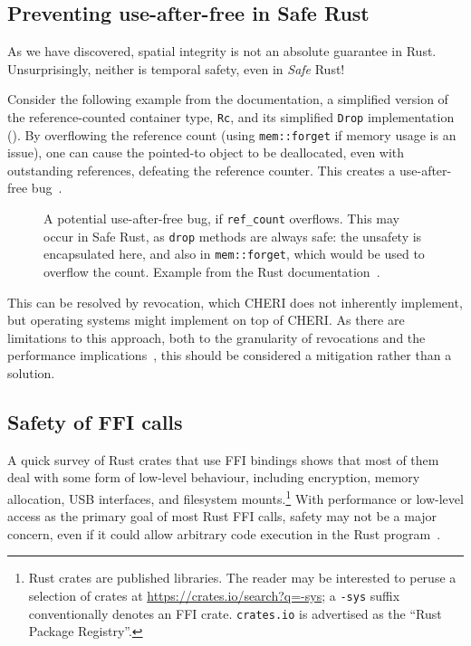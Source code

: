 \documentclass[dissertation.tex]{subfiles}
\begin{document}
\subsection{Preventing use-after-free in Safe Rust}
\label{sec:eval-rust-use-after-free}

As we have discovered, spatial integrity is not an absolute guarantee in
Rust.
Unsurprisingly, neither is temporal safety, even in \emph{Safe} Rust!

Consider the following example from the documentation, a simplified
version of the reference-counted container type, \texttt{Rc}, and its
simplified \texttt{Drop} implementation ().
By overflowing the reference count (using \texttt{mem::forget} if memory
usage is an issue), one can cause the pointed-to object to be
deallocated, even with outstanding references, defeating the reference
counter.
This creates a use-after-free bug~\cite{rust-nomicon-rc-leak}.

\begin{figure}[ht]
    
    \caption{
        A potential use-after-free bug, if \texttt{ref\_count}
        overflows.
        This may occur in Safe Rust, as \texttt{drop} methods are always
        safe: the unsafety is encapsulated here, and also in
        \texttt{mem::forget}, which would be used to overflow the count.
        Example from the Rust documentation~\cite{rust-nomicon-rc-leak}.
    }
    \label{lst:eval-rust-rc-drop}
\end{figure}

This can be resolved by revocation, which CHERI does not inherently
implement, but operating systems might implement on top of CHERI.
As there are limitations to this approach, both to the granularity of
revocations and the performance implications~\cite{cheri-v6}, this
should be considered a mitigation rather than a solution.


\subsection{Safety of FFI calls}
\label{sec:eval-rust-xprocess}


A quick survey of Rust crates that use FFI bindings shows that most of
them deal with some form of low-level behaviour, including encryption,
memory allocation, USB interfaces, and filesystem mounts.\footnote{
    Rust crates are published libraries.
    The reader may be interested to peruse a selection of crates at
    \url{https://crates.io/search?q=-sys};
    a \texttt{-sys} suffix conventionally denotes an FFI crate.
    \texttt{crates.io} is advertised as the ``Rust Package Registry''.
}
With performance or low-level access as the primary goal of most Rust
FFI calls, safety may not be a major concern, even if it could allow
arbitrary code execution in the Rust
program~\cite{szekeres-eternal-war}.
\end{document}
